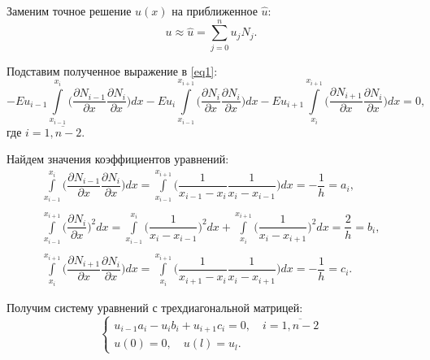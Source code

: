 \documentclass[12pt,a4paper]{article}
\begin{document}
Заменим точное решение $u(x)$ на приближенное $\hat{u}$:
\begin{equation}
    u \approx \hat{u} = \sum\limits_{j = 0}^n u_j N_j.
\end{equation}

Подставим полученное выражение в \ref{eq1}:
\begin{equation}
    - E u_{i-1}\int\limits_{x_{i - 1}}^{x_i}\Big(\dfrac{\partial N_{i-1}}{\partial x}\dfrac{\partial N_i}{\partial x}\Big) dx - 
    E u_{i}\int\limits_{x_{i - 1}}^{x_{i + 1}}\Big(\dfrac{\partial N_{i}}{\partial x}\dfrac{\partial N_i}{\partial x}\Big) dx -
    E u_{i + 1}\int\limits_{x_{i}}^{x_{i + 1}}\Big(\dfrac{\partial N_{i + 1}}{\partial x}\dfrac{\partial N_i}{\partial x}\Big) dx = 0,
\end{equation}
где $i = \overline{1, n-2}.$

Найдем значения коэффициентов уравнений:
\begin{equation}
    \label{eq2}
    \begin{array}{l}
        \int\limits_{x_{i - 1}}^{x_i}\Big(\dfrac{\partial N_{i-1}}{\partial x}\dfrac{\partial N_i}{\partial x}\Big) dx = 
        \int\limits_{x_{i - 1}}^{x_{i + 1}}\Big(\dfrac{1}{x_{i-1} - x_i}\dfrac{1}{x_i - x_{i-1}}\Big) dx = -\dfrac{1}{h} = a_i, \\ \\
        \int\limits_{x_{i - 1}}^{x_{i + 1}}\Big(\dfrac{\partial N_{i}}{\partial x}\Big)^2 dx = 
        \int\limits_{x_{i - 1}}^{x_{i}}\Big(\dfrac{1}{x_i - x_{i-1}}\Big)^2 dx + 
        \int\limits_{x_{i}}^{x_{i + 1}}\Big(\dfrac{1}{x_i - x_{i+1}}\Big)^2 dx = \dfrac{2}{h} = b_i, \\ \\ 
        \int\limits_{x_{i}}^{x_{i + 1}}\Big(\dfrac{\partial N_{i+1}}{\partial x}\dfrac{\partial N_i}{\partial x}\Big) dx = 
        \int\limits_{x_{i}}^{x_{i + 1}}\Big(\dfrac{1}{x_{i+1} - x_i}\dfrac{1}{x_i - x_{i+1}}\Big) dx = -\dfrac{1}{h} = c_i.
    \end{array}
\end{equation}

Получим систему уравнений с трехдиагональной матрицей:
\begin{equation}
    \begin{cases}
      u_{i-1} a_i - u_i b_i + u_{i+1} c_i = 0, \quad i = \overline{1, n-2}\\
      u(0) = 0, \quad u(l) = u_{l}.
    \end{cases}
\end{equation}
\end{document}

